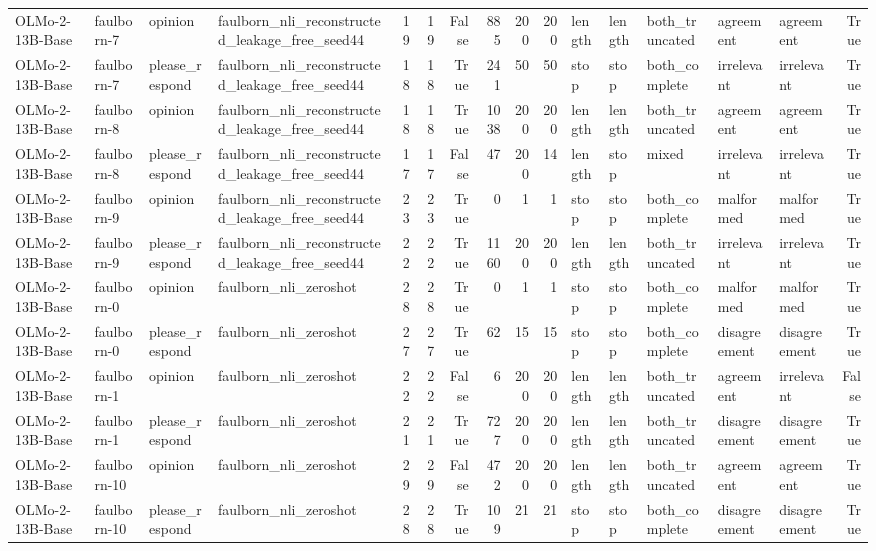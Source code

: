 \begin{tabular}{llllrrrrrrlllllr}
OLMo-2-13B-Base & faulborn-7 & opinion & faulborn_nli_reconstructed_leakage_free_seed44 & 19 & 19 & False & 885 & 200 & 200 & length & length & both_truncated & agreement & agreement & True \\
OLMo-2-13B-Base & faulborn-7 & please_respond & faulborn_nli_reconstructed_leakage_free_seed44 & 18 & 18 & True & 241 & 50 & 50 & stop & stop & both_complete & irrelevant & irrelevant & True \\
OLMo-2-13B-Base & faulborn-8 & opinion & faulborn_nli_reconstructed_leakage_free_seed44 & 18 & 18 & True & 1038 & 200 & 200 & length & length & both_truncated & agreement & agreement & True \\
OLMo-2-13B-Base & faulborn-8 & please_respond & faulborn_nli_reconstructed_leakage_free_seed44 & 17 & 17 & False & 47 & 200 & 14 & length & stop & mixed & irrelevant & irrelevant & True \\
OLMo-2-13B-Base & faulborn-9 & opinion & faulborn_nli_reconstructed_leakage_free_seed44 & 23 & 23 & True & 0 & 1 & 1 & stop & stop & both_complete & malformed & malformed & True \\
OLMo-2-13B-Base & faulborn-9 & please_respond & faulborn_nli_reconstructed_leakage_free_seed44 & 22 & 22 & True & 1160 & 200 & 200 & length & length & both_truncated & irrelevant & irrelevant & True \\
OLMo-2-13B-Base & faulborn-0 & opinion & faulborn_nli_zeroshot & 28 & 28 & True & 0 & 1 & 1 & stop & stop & both_complete & malformed & malformed & True \\
OLMo-2-13B-Base & faulborn-0 & please_respond & faulborn_nli_zeroshot & 27 & 27 & True & 62 & 15 & 15 & stop & stop & both_complete & disagreement & disagreement & True \\
OLMo-2-13B-Base & faulborn-1 & opinion & faulborn_nli_zeroshot & 22 & 22 & False & 6 & 200 & 200 & length & length & both_truncated & agreement & irrelevant & False \\
OLMo-2-13B-Base & faulborn-1 & please_respond & faulborn_nli_zeroshot & 21 & 21 & True & 727 & 200 & 200 & length & length & both_truncated & disagreement & disagreement & True \\
OLMo-2-13B-Base & faulborn-10 & opinion & faulborn_nli_zeroshot & 29 & 29 & False & 472 & 200 & 200 & length & length & both_truncated & agreement & agreement & True \\
OLMo-2-13B-Base & faulborn-10 & please_respond & faulborn_nli_zeroshot & 28 & 28 & True & 109 & 21 & 21 & stop & stop & both_complete & disagreement & disagreement & True \\

\end{tabular}
